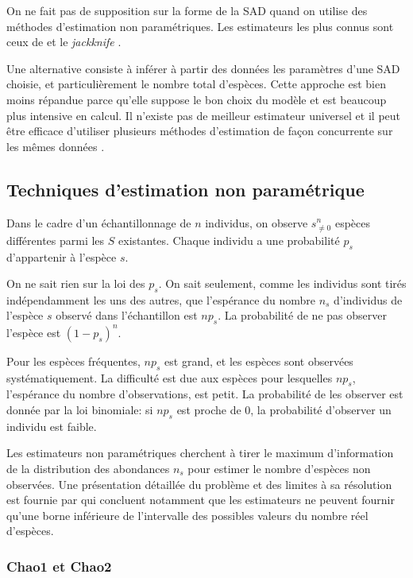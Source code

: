 \documentclass[
  11pt,
  french,
  a4paper,
  extrafontsizes,onecolumn,openright
  ]{memoir}
\begin{document}
On ne fait pas de supposition sur la forme de la SAD quand on utilise des méthodes d'estimation non paramétriques.
Les estimateurs les plus connus sont ceux de \textcite{Chao1984} et le \emph{jackknife} \autocite{Burnham1979}.

Une alternative consiste à inférer à partir des données les paramètres d'une SAD choisie, et particulièrement le nombre total d'espèces.
Cette approche est bien moins répandue parce qu'elle suppose le bon choix du modèle et est beaucoup plus intensive en calcul.
Il n'existe pas de meilleur estimateur universel \autocite{OHara2005} et il peut être efficace d'utiliser plusieurs méthodes d'estimation de façon concurrente sur les mêmes données \autocite{Basset2012}.

\hypertarget{techniques-destimation-non-paramuxe9trique}{%
\subsection{Techniques d'estimation non paramétrique}\label{techniques-destimation-non-paramuxe9trique}}

Dans le cadre d'un échantillonnage de \(n\) individus, on observe \(s^{n}_{\ne 0}\) espèces différentes parmi les \(S\) existantes.
Chaque individu a une probabilité \(p_s\) d'appartenir à l'espèce \(s\).

On ne sait rien sur la loi des \(p_s\).
On sait seulement, comme les individus sont tirés indépendamment les uns des autres, que l'espérance du nombre \(n_s\) d'individus de l'espèce \(s\) observé dans l'échantillon est \(np_s\).
La probabilité de ne pas observer l'espèce est \((1-p_s)^n\).

Pour les espèces fréquentes, \(np_s\) est grand, et les espèces sont observées systématiquement.
La difficulté est due aux espèces pour lesquelles \(np_s\), l'espérance du nombre d'observations, est petit.
La probabilité de les observer est donnée par la loi binomiale: si \(np_s\) est proche de 0, la probabilité d'observer un individu est faible.

Les estimateurs non paramétriques cherchent à tirer le maximum d'information de la distribution des abondances \(n_s\) pour estimer le nombre d'espèces non observées.
Une présentation détaillée du problème et des limites à sa résolution est fournie par \textcite{Mao2005} qui concluent notamment que les estimateurs ne peuvent fournir qu'une borne inférieure de l'intervalle des possibles valeurs du nombre réel d'espèces.

\hypertarget{chao1-et-chao2}{%
\subsubsection{Chao1 et Chao2}\label{chao1-et-chao2}}
\end{document}
